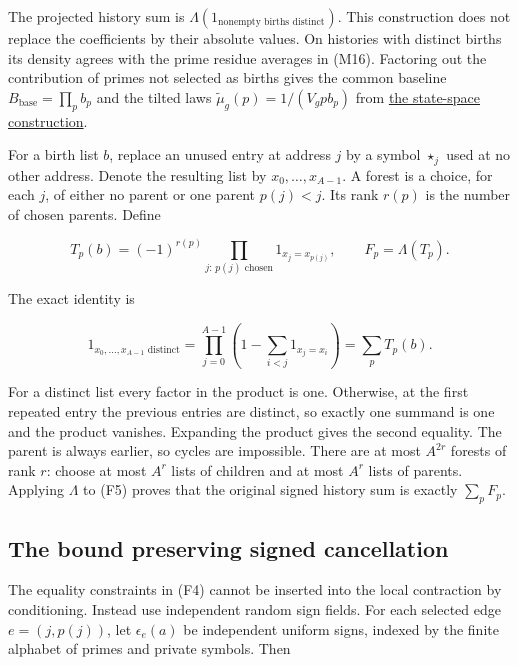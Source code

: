 The projected history sum is
\(\Lambda(1_{\text{nonempty births distinct}})\). This construction does
not replace the coefficients by their absolute values. On histories with
distinct births its density agrees with the prime residue averages in
(M16). Factoring out the contribution of primes not selected as births
gives the common baseline \(B_{\mathrm{base}}=\prod_p b_p\) and the
tilted laws \(\widetilde\mu_g(p)=1/(V_gp b_p)\) from
\protect\hyperlink{marked-correlation-the-arithmetic-state-space-and-the-local-contraction}{the
state-space construction}.

For a birth list \(b\), replace an unused entry at address \(j\) by a
symbol \(\star_j\) used at no other address. Denote the resulting list
by \(x_0,\ldots,x_{A-1}\). A forest is a choice, for each \(j\), of
either no parent or one parent \(p(j)<j\). Its rank \(r(p)\) is the
number of chosen parents. Define

\[
T_p(b)=(-1)^{r(p)}\prod_{j:\,p(j)\text{ chosen}}
                  1_{x_j=x_{p(j)}},\qquad F_p=\Lambda(T_p).
\tag{F4}
\]

The exact identity is

\[
1_{x_0,\ldots,x_{A-1}\text{ distinct}}
 =\prod_{j=0}^{A-1}\left(1-\sum_{i<j}1_{x_j=x_i}\right)
 =\sum_p T_p(b). \tag{F5}
\]

For a distinct list every factor in the product is one. Otherwise, at
the first repeated entry the previous entries are distinct, so exactly
one summand is one and the product vanishes. Expanding the product gives
the second equality. The parent is always earlier, so cycles are
impossible. There are at most \(A^{2r}\) forests of rank \(r\): choose
at most \(A^r\) lists of children and at most \(A^r\) lists of parents.
Applying \(\Lambda\) to (F5) proves that the original signed history sum
is exactly \(\sum_p F_p\).


\hypertarget{forest-moments-the-bound-preserving-signed-cancellation}{%
\subsection{The bound preserving signed
cancellation}\label{forest-moments-the-bound-preserving-signed-cancellation}}

The equality constraints in (F4) cannot be inserted into the local
contraction by conditioning. Instead use independent random sign fields.
For each selected edge \(e=(j,p(j))\), let \(\epsilon_e(a)\) be
independent uniform signs, indexed by the finite alphabet of primes and
private symbols. Then

